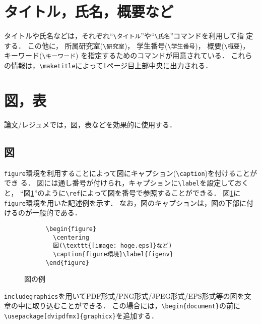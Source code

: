 \documentclass[twocolumn]{jarticle} %
\begin{document}
\section{タイトル，氏名，概要など}

タイトルや氏名などは，それぞれ``\verb|\タイトル|''や``\verb|\氏名|''コマンドを利用して指
定する．
この他に，
  所属研究室(\verb|\研究室|)，
  学生番号(\verb|\学生番号|)，
  概要(\verb|\概要|)，
  キーワード(\verb|\キーワード|)
を指定するためのコマンドが用意されている．
これらの情報は，\verb|\maketitle|によって1ページ目上部中央に出力される．

\section{図，表}\label{chap:fig-tab-exp}

論文/レジュメでは，図，表などを効果的に使用する．

\subsection{図}

{\tt figure}環境を利用することによって図にキャプション(\verb|\caption|)を付けることができ
る．
図には通し番号が付けられ，キャプションに\verb|\label|を設定しておくと，
``図\ref{fig:sample}''のように\verb|\ref|によって図を番号で参照することができる．
図\ref{fig:sample}に{\tt figure}環境を用いた記述例を示す．
なお，図のキャプションは，図の下部に付けるのが一般的である．

\begin{figure}[t]
  \centering
  \begin{minipage}{0.45\textwidth}
    \begin{verbatim}
	  \begin{figure}
	    \centering
	    図(\texttt{[image: hoge.eps]}など)
	    \caption{figure環境}\label{figenv}
	  \end{figure}
    \end{verbatim}
  \end{minipage}
  \caption{図の例}\label{fig:sample}
\end{figure}

\verb|includegraphics|を用いてPDF形式/PNG形式/JPEG形式/EPS形式等の図を文章の中に取り込むことができる．
この場合には，\verb|\begin{document}|の前に\verb|\usepackage[dvipdfmx]{graphicx}|を追加する．
\end{document}
